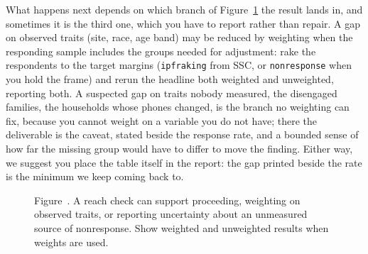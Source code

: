 \documentclass[
    a4paper,
    fontsize=10pt,
    twoside=true,
    numbers=noenddot,
]{kaobook}
\begin{document}
What happens next depends on which branch of Figure~\ref{fig:ch05-reachtree} the result lands in, and sometimes it is the third one, which you have to report rather than repair. A gap on observed traits (site, race, age band) may be reduced by weighting when the responding sample includes the groups needed for adjustment: rake the respondents to the target margins (\texttt{ipfraking} from SSC, or \texttt{nonresponse} when you hold the frame) and rerun the headline both weighted and unweighted, reporting both. A suspected gap on traits nobody measured, the disengaged families, the households whose phones changed, is the branch no weighting can fix, because you cannot weight on a variable you do not have; there the deliverable is the caveat, stated beside the response rate, and a bounded sense of how far the missing group would have to differ to move the finding. Either way, we suggest you place the table itself in the report: the gap printed beside the rate is the minimum we keep coming back to.

\begin{figure}[htbp]
\centering
{}
\label{fig:ch05-reachtree}
\begin{center}\small Figure~\thefigure. A reach check can support proceeding, weighting on observed traits, or reporting uncertainty about an unmeasured source of nonresponse. Show weighted and unweighted results when weights are used.\end{center}
\end{figure}
\end{document}
